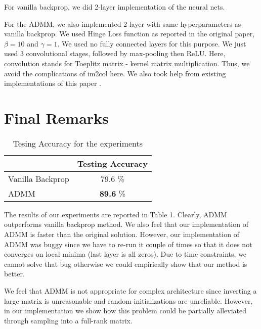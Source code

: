 \documentclass[12pt]{article}
\begin{document}
For vanilla backprop, we did 2-layer implementation of the neural nets.

For the ADMM, we also implemented 2-layer with same hyperparameters as vanilla backprop.
We used Hinge Loss function as reported in the original paper, $\beta = 10$ and $\gamma = 1$.
We used no fully connected layers for this purpose.
We just used 3 convolutional stages, followed by max-pooling then ReLU.
Here, convolution stands for Toeplitz matrix - kernel matrix multiplication.
Thus, we avoid the complications of im2col here.
We also took help from existing implementations of this paper \cite{dongzhuoyao}.

\section{Final Remarks}

\begin{table}[h]
	\centering
	\label{my-label}
	\begin{tabular}{@{}lc@{}}
		\toprule
		\textbf{}        & \textbf{Testing Accuracy} \\ \midrule
		Vanilla Backprop & 79.6 \%                   \\
		ADMM             & \textbf{89.6} \%                   \\ \bottomrule
	\end{tabular}
\caption{Tesing Accuracy for the experiments}
\end{table}

The results of our experiments are reported in Table 1.
Clearly, ADMM outperforms vanilla backprop method.
We also feel that our implementation of ADMM is faster than the original solution.
However, our implementation of ADMM was buggy since we have to re-run it couple of times so that it does not converges on local minima (last layer is all zeros).
Due to time constraints, we cannot solve that bug otherwise we could empirically show that our method is better.

We feel that ADMM is not appropriate for complex architecture since inverting a large matrix is unreasonable and random initializations are unreliable.
However, in our implementation we show how this problem could be partially alleviated through sampling into a full-rank matrix.



\end{document}

